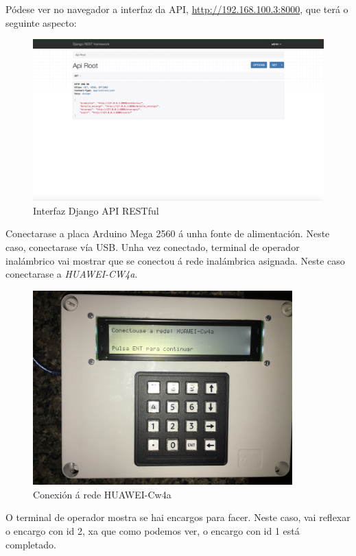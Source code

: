 \documentclass[11pt,twoside]{book}
\begin{document}
Pódese ver no navegador a interfaz da API, \url{http://192.168.100.3:8000}, que terá o seguinte aspecto:

\begin{figure}[H]
	\begin{center}
		\includegraphics[width=12cm]{images/API_Root_Django.png}
	\end{center}
	\caption{Interfaz Django API RESTful}
	\label{fig:Encargo1}
\end{figure}

Conectarase a placa Arduino Mega 2560 á unha fonte de alimentación. Neste caso, conectarase vía USB. Unha vez conectado, terminal de operador inalámbrico vai mostrar que se conectou á rede inalámbrica asignada. Neste caso conectarase a \textit{HUAWEI-CW4a}.

\begin{figure}[H]
	\begin{center}
		\includegraphics[width=10cm]{images/conectar_rede.JPG}
	\end{center}
	\caption{Conexión á rede HUAWEI-Cw4a}
	\label{fig:Encargo1}
\end{figure}

O terminal de operador mostra se hai encargos para facer. Neste caso, vai reflexar o encargo con id 2, xa que como podemos ver, o encargo con id 1 está completado.
\end{document}
